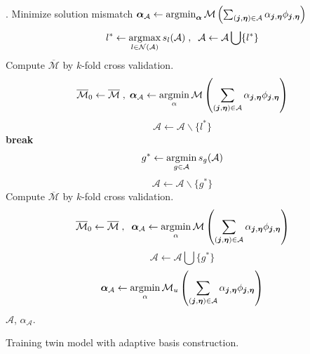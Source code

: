 \begin{algorithm}
\begin{algorithmic}[1]
.
\STATE Minimize solution mismatch 
       $
           \boldsymbol{\alpha}_{\mathcal{A}} \leftarrow \operatorname*{\arg\!\min}_{\boldsymbol{\alpha}} 
           \mathcal{M}\left(\sum_{
           (\boldsymbol{j}, \boldsymbol{\eta}) \in \mathcal{A}} 
           \alpha_{\boldsymbol{j}, 
           \boldsymbol{\eta}} \phi_{\boldsymbol{j}, \boldsymbol{\eta}}\right)
       $ 
\LOOP 
\STATE $$l^* \leftarrow \operatorname*{\arg\!\max}_{l \in \mathcal{N}(\mathcal{A})} s_l(\mathcal{A})\;,\;\;
       \mathcal{A} \leftarrow 
       \mathcal{A} \bigcup \{l^*\}$$
\STATE Compute $\overline{\mathcal{M}}$ by $k$-fold cross validation.
    \STATE $$
               \overline{\mathcal{M}}_0\leftarrow \overline{\mathcal{M}}\;,\;
               \boldsymbol{\alpha}_{\mathcal{A}} \leftarrow \operatorname*{\arg\!\min}_{\alpha} 
               \mathcal{M}\left(\sum_{(\boldsymbol{j}, \boldsymbol{\eta}) 
               \in \mathcal{A}} \alpha_{\boldsymbol{j}, \boldsymbol{\eta}} 
               \phi_{\boldsymbol{j}, \boldsymbol{\eta}}\right)
           $$
\ELSE \STATE 
       $$\mathcal{A} \leftarrow 
       \mathcal{A} \backslash \{l^*\}$$
       \textbf{break}
\ENDIF
\STATE  
       $$g^* \leftarrow \operatorname*{\arg\!\min}_{g \in \mathcal{A}} s_g(\mathcal{A})$$
\STATE  
       $$\mathcal{A} \leftarrow 
       \mathcal{A} \backslash \{g^*\}$$
\STATE Compute $\overline{\mathcal{M}}$ by $k$-fold cross validation.
\STATE $$\overline{\mathcal{M}}_0 \leftarrow \overline{\mathcal{M}}\;,\;\;
         \boldsymbol{\alpha}_{\mathcal{A}} \leftarrow 
         \operatorname*{\arg\!\min}_{\alpha} \mathcal{M}\left(\sum_{(\boldsymbol{j}, \boldsymbol{\eta}) 
         \in \mathcal{A}} \alpha_{\boldsymbol{j}, \boldsymbol{\eta}} 
         \phi_{\boldsymbol{j}, \boldsymbol{\eta}}\right)
       $$
\ELSE \STATE
       $$\mathcal{A} \leftarrow \mathcal{A}\bigcup \{g^*\}$$
\ENDIF
\ENDIF
\ENDLOOP
\STATE
       $$
           \boldsymbol{\alpha}_{\mathcal{A}} \leftarrow \operatorname*{\arg\!\min}_{\alpha} \mathcal{M}_u
           \left(\sum_{(\boldsymbol{j}, \boldsymbol{\eta}) \in \mathcal{A}} 
           \alpha_{\boldsymbol{j}, \boldsymbol{\eta}} 
           \phi_{\boldsymbol{j}, \boldsymbol{\eta}}\right)
       $$
\ENSURE $\mathcal{A}$, $\alpha_{\mathcal{A}}$.
\end{algorithmic}
\caption{Training twin model with adaptive basis construction.}
\label{alg: train twin}
\end{algorithm}




